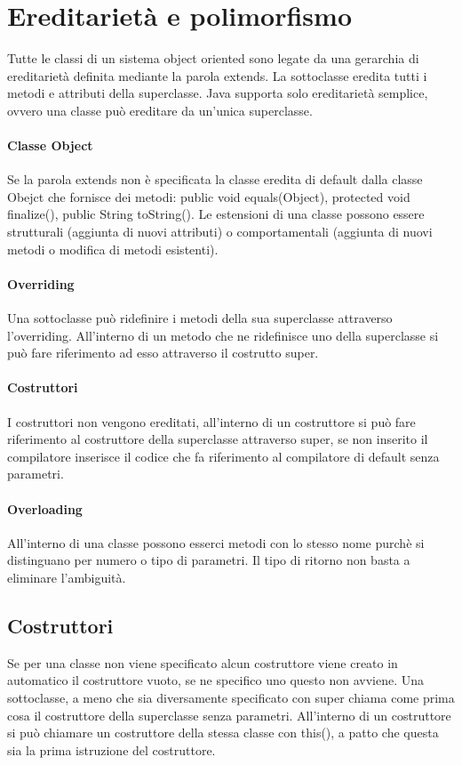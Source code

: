 \chapter{Ereditariet\`a e polimorfismo}
Tutte le classi di un sistema object oriented sono legate da una gerarchia di ereditariet\`a definita mediante la parola extends. La sottoclasse eredita tutti i metodi
e attributi della superclasse. Java supporta solo ereditariet\`a semplice, ovvero una classe pu\`o ereditare da un'unica superclasse.
\subsubsection{Classe Object}
Se la parola extends non \`e specificata la classe eredita di default dalla classe Obejct che fornisce dei metodi: public void equals(Object), protected void finalize(), 
public String toString(). Le estensioni di una classe possono essere strutturali (aggiunta di nuovi attributi) o comportamentali (aggiunta di nuovi metodi o modifica di
metodi esistenti).
\subsubsection{Overriding}
Una sottoclasse pu\`o ridefinire i metodi della sua superclasse attraverso l'overriding. All'interno di un metodo che ne ridefinisce uno della superclasse si pu\`o fare
riferimento ad esso attraverso il costrutto super. 
\subsubsection{Costruttori}
I costruttori non vengono ereditati, all'interno di un costruttore si pu\`o fare riferimento al costruttore della superclasse attraverso super, se non inserito il 
compilatore inserisce il codice che fa riferimento al compilatore di default senza parametri. 
\subsubsection{Overloading}
All'interno di una classe possono esserci metodi con lo stesso nome purch\`e si distinguano per numero o tipo di parametri. Il tipo di ritorno non basta a eliminare 
l'ambiguit\`a. 
\section{Costruttori}
Se per una classe non viene specificato alcun costruttore viene creato in automatico il costruttore vuoto, se ne specifico uno questo non avviene. Una sottoclasse, a
meno che sia diversamente specificato con super chiama come prima cosa il costruttore della superclasse senza parametri. All'interno di un costruttore si pu\`o chiamare
un costruttore della stessa classe con this(), a patto che questa sia la prima istruzione del costruttore. 
